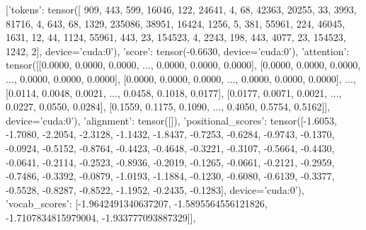         [{'tokens': tensor([   909,    443,    599,  16046,    122,  24641,      4,     68,  42363,
         20255,     33,   3993,  81716,      4,    643,     68,   1329, 235086,
         38951,  16424,   1256,      5,    381,  55961,    224,  46045,   1631,
            12,     44,   1124,  55961,    443,     23, 154523,      4,   2243,
           198,    443,   4077,     23, 154523,   1242,      2],
       device='cuda:0'), 'score': tensor(-0.6630, device='cuda:0'), 'attention': tensor([[0.0000, 0.0000, 0.0000,  ..., 0.0000, 0.0000, 0.0000],
        [0.0000, 0.0000, 0.0000,  ..., 0.0000, 0.0000, 0.0000],
        [0.0000, 0.0000, 0.0000,  ..., 0.0000, 0.0000, 0.0000],
        ...,
        [0.0114, 0.0048, 0.0021,  ..., 0.0458, 0.1018, 0.0177],
        [0.0177, 0.0071, 0.0021,  ..., 0.0227, 0.0550, 0.0284],
        [0.1559, 0.1175, 0.1090,  ..., 0.4050, 0.5754, 0.5162]],
       device='cuda:0'), 'alignment': tensor([]), 'positional_scores': tensor([-1.6053, -1.7080, -2.2054, -2.3128, -1.1432, -1.8437, -0.7253, -0.6284,
        -0.9743, -0.1370, -0.0924, -0.5152, -0.8764, -0.4423, -0.4648, -0.3221,
        -0.3107, -0.5664, -0.4430, -0.0641, -0.2114, -0.2523, -0.8936, -0.2019,
        -0.1265, -0.0661, -0.2121, -0.2959, -0.7486, -0.3392, -0.0879, -1.0193,
        -1.1884, -0.1230, -0.6080, -0.6139, -0.3377, -0.5528, -0.8287, -0.8522,
        -1.1952, -0.2435, -0.1283], device='cuda:0'), 'vocab_scores': [-1.9642491340637207, -1.5895564556121826, -1.7107834815979004, -1.933777093887329]}],
        
